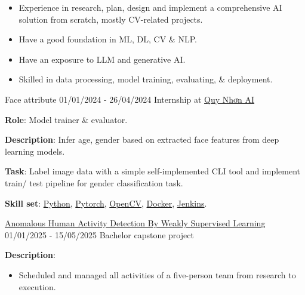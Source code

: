 \documentclass{src/preamble/doc_class}
\begin{document}
	\begin{MainPart}

		\Specialty
		{
			\begin{itemize}[label=$\bullet$,topsep=-.5ex,itemsep=-0.5ex]
				\item Experience in research, plan, design and implement a comprehensive AI solution from scratch, mostly CV-related projects.
				\item Have a good foundation in ML, DL, CV \& NLP.
				\item Have an exposure to LLM and generative AI.
				\item Skilled in data processing, model training, evaluating, \& deployment.
			\end{itemize}
		}

        \Experience
        {\ColorHighlight}
        {Face attribute}
        {01/01/2024 - 26/04/2024}
        {Internship at \href{https://qaidora.com/}{Quy Nhơn AI}}
        {
            \textbf{Role}: Model trainer \& evaluator.\\
            \vspace{.15cm}

            \textbf{Description}: Infer age, gender based on extracted face features from deep learning models.
            \vspace{.15cm}

            \textbf{Task}: Label image data with a simple self-implemented CLI tool and implement train/ test pipeline for gender classification task.\\
            \vspace{.15cm}

            \textbf{Skill set}: \href{https://www.python.org/}{Python}, \href{https://pytorch.org/}{Pytorch}, \href{https://opencv.org/}{OpenCV}, \href{https://www.docker.com/}{Docker}, \href{https://www.jenkins.io/}{Jenkins}.
        }

        \Experience
        {\ColorHighlight}
        {\href{https://github.com/diligent-man/Video_Anomaly_Detection}{Anomalous Human Activity Detection By Weakly Supervised Learning}}
        {01/01/2025 - 15/05/2025}
        {Bachelor capstone project}
        {
            \textbf{Description}:
            \begin{itemize}[label=$\bullet$,topsep=-.5ex,itemsep=-0.5ex]
            	\item Scheduled and managed all activities of a five-person team from research to execution.


\end{itemize}}
\end{MainPart}
\end{document}
